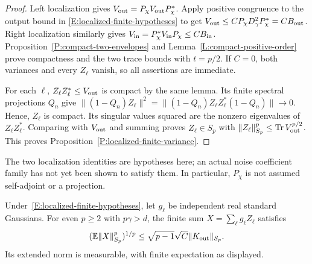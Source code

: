 \begin{proof}
  Left localization gives $V_{\rm out}=P_\chi V_{\rm out}P_\chi^*$.
  Apply positive congruence to the output bound in
  \eqref{E:localized-finite-hypotheses} to get
  $V_{\rm out}\le CP_\chi D_\gamma^2P_\chi^*=CB_{\rm out}$.
  Right localization similarly gives
  $V_{\rm in}=P_\chi^*V_{\rm in}P_\chi\le CB_{\rm in}$.
  Proposition~\ref{P:compact-two-envelopes} and
  Lemma~\ref{L:compact-positive-order} prove compactness and the two trace
  bounds with $t=p/2$. If $C=0$, both variances and every $Z_\ell$ vanish,
  so all assertions are immediate.

  For each $\ell$, $Z_\ell Z_\ell^*\le V_{\rm out}$ is compact by the
  same lemma. Its finite spectral projections $Q_n$ give
  $\|(1-Q_n)Z_\ell\|^2
  =\|(1-Q_n)Z_\ell Z_\ell^*(1-Q_n)\|\to0$.
  Hence, $Z_\ell$ is compact. Its singular values squared are the nonzero
  eigenvalues of $Z_\ell Z_\ell^*$. Comparing with $V_{\rm out}$ and
  summing proves $Z_\ell\in S_p$ with
  $\|Z_\ell\|_{S_p}^p\le\operatorname{Tr}V_{\rm out}^{p/2}$.
  This proves Proposition~\ref{P:localized-finite-variance}.
\end{proof}

The two localization identities are hypotheses here; an actual noise
coefficient family has not yet been shown to satisfy them. In particular,
$P_\chi$ is not assumed self-adjoint or a projection.

\begin{corollary}\label{C:finite-gaussian-operators}
  Under~\eqref{E:localized-finite-hypotheses}, let $g_\ell$ be independent
  real standard Gaussians. For even $p \ge 2$ with $p\gamma>d$, the finite
  sum $X=\sum_\ell g_\ell Z_\ell$ satisfies
  \begin{equation}\label{E:finite-gaussian-operator-bound}
    (\mathbb{E}\|X\|_{S_p}^p)^{1/p}
    \le\sqrt{p-1}\sqrt C\|K_{\rm out}\|_{S_p}.
  \end{equation}
  Its extended norm is measurable, with finite expectation as displayed.
\end{corollary}


